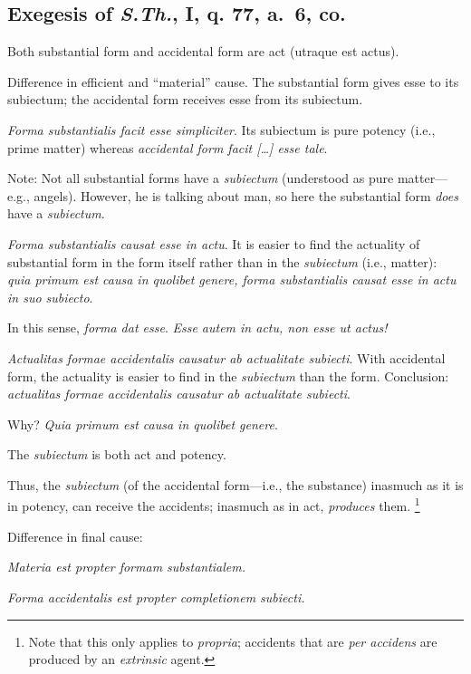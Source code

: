 \begin{DONE}

\section{Exegesis of \emph{S.Th.}, I, q. 77, a.~6, co.}

Both substantial form and accidental form are act (utraque est actus).

Difference in efficient and \enquote{material} cause.
The substantial form gives esse to its subiectum; the accidental form receives esse from its subiectum.

\emph{Forma substantialis facit esse simpliciter}.
Its subiectum is pure potency (i.e., prime matter) whereas \emph{accidental form facit [\ldots] esse tale}.

Note: Not all substantial forms have a \emph{subiectum} (understood as pure matter---e.g., angels). However, he is talking about man, so here the substantial form \emph{does} have a \emph{subiectum}.

\emph{Forma substantialis causat esse in actu}.
It is easier to find the actuality of substantial form in the form itself rather than in the \emph{subiectum} (i.e., matter): \emph{quia primum est causa in quolibet genere, forma substantialis causat esse in actu in suo subiecto}.

In this sense, \emph{forma dat esse}. \emph{Esse autem in actu, non esse ut actus!}

\emph{Actualitas formae accidentalis causatur ab actualitate subiecti}.
With accidental form, the actuality is easier to find in the \emph{subiectum} than the form. Conclusion: \emph{actualitas formae accidentalis causatur ab actualitate subiecti}.

Why? \emph{Quia primum est causa in quolibet genere}.

The \emph{subiectum} is both act and potency.

Thus, the \emph{subiectum} (of the accidental form—i.e., the substance) inasmuch as it is in potency, can receive the accidents; inasmuch as in act, \emph{produces} them.%
%
\footnote{Note that this only applies to \emph{propria}; accidents that are \emph{per accidens} are produced by an \emph{extrinsic} agent.}

Difference in final cause:

\emph{Materia est propter formam substantialem.}

\emph{Forma accidentalis est propter completionem subiecti.}


\end{DONE}
